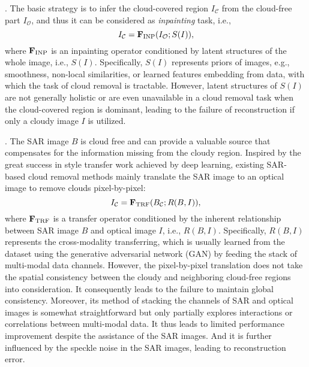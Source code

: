 \documentclass[a4paper,fleqn]{cas-dc}
\newcommand{\ie}[1]{{i.e.}}
\begin{document}
. The basic strategy is to infer the cloud-covered region $I_{\mathcal{C}}$ from the cloud-free part $I_{\mathcal{O}}$, and thus it can be considered as {\it inpainting} task, \ie{},
\begin{equation}
	\setlength{\abovedisplayskip}{4pt}	
	\setlength{\belowdisplayskip}{4pt}
	I_{\mathcal{C}} = \mathbf{F}_\textnormal{INP}(I_{\mathcal{O}}; S(I)),
\end{equation}
where $\mathbf{F}_\textnormal{INP}$ is an inpainting operator conditioned by latent structures of the whole image, \ie{}, $S(I)$. Specifically, $S(I)$ represents priors of images, e.g., smoothness, non-local similarities, or learned features embedding from data, with which the task of cloud removal is tractable. However, latent structures of $S(I)$ are not generally holistic or are even unavailable in a cloud removal task when the cloud-covered region is dominant, leading to the failure of reconstruction if only a cloudy image $I$ is utilized.









. The SAR image $B$ is cloud free and can provide a valuable source that compensates for the information missing from the cloudy region. Inspired by the great success in style transfer work achieved by deep learning, existing SAR-based cloud removal methods mainly translate the SAR image to an optical image to remove clouds pixel-by-pixel:
\begin{equation}	
	\setlength{\abovedisplayskip}{4pt}	
	\setlength{\belowdisplayskip}{4pt}
	I_{\mathcal{C}} = \mathbf{F}_\textnormal{TRF}(B_{\mathcal{C}}; R(B,I)),
\end{equation}
where $\mathbf{F}_\textnormal{TRF}$ is a transfer operator conditioned by the inherent relationship between SAR image $B$ and optical image $I$, \ie{}, $R(B,I)$. Specifically, $R(B,I)$ represents the cross-modality transferring, which is usually learned from the dataset using the generative adversarial network (GAN) by feeding the stack of multi-modal data channels. 
However, the pixel-by-pixel translation does not take the spatial consistency between the cloudy and neighboring cloud-free regions into consideration. It consequently leads to the failure to maintain global consistency. Moreover, its method of stacking the channels of SAR and optical images is somewhat straightforward but only partially explores interactions or correlations between multi-modal data. It thus leads to limited performance improvement despite the assistance of the SAR images. And it is further influenced by the speckle noise in the SAR images, leading to reconstruction error. 
\end{document}
